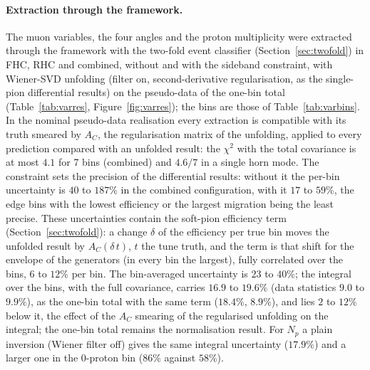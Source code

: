 \documentclass[11pt,a4paper]{article}
\begin{document}
\paragraph{Extraction through the framework.} The muon variables, the four angles and the proton multiplicity were
extracted through the framework with the two-fold event classifier (Section~\ref{sec:twofold}) in FHC, RHC and combined,
without and with the sideband constraint, with Wiener-SVD unfolding (filter on, second-derivative regularisation, as the
single-pion differential results) on the pseudo-data of the one-bin total (Table~\ref{tab:varres},
Figure~\ref{fig:varres}); the bins are those of Table~\ref{tab:varbins}. In the nominal pseudo-data realisation every
extraction is compatible with its truth smeared by $A_C$, the regularisation matrix of the unfolding, applied to every
prediction compared with an unfolded result: the $\chi^2$ with the total covariance is at most $4.1$ for 7 bins
(combined) and $4.6/7$ in a single horn mode. The constraint sets the precision of the differential results: without it the per-bin uncertainty is
$40$ to $187\%$ in the combined configuration, with it $17$ to $59\%$, the edge bins with the lowest efficiency or the
largest migration being the least precise. These uncertainties contain the soft-pion efficiency term
(Section~\ref{sec:twofold}): a change $\delta$ of the efficiency per true bin moves the unfolded result by
$A_C(\delta\, t)$, $t$ the tune truth, and the term is that shift for the envelope of the generators (in every bin
the largest), fully correlated over the bins, $6$ to $12\%$ per bin. The bin-averaged uncertainty is $23$ to $40\%$;
the integral over the bins, with the full covariance, carries $16.9$ to $19.6\%$ (data statistics $9.0$ to $9.9\%$),
as the one-bin total with the same term ($18.4\%$, $8.9\%$), and lies $2$ to $12\%$ below it, the effect of the $A_C$
smearing of the regularised unfolding on the integral; the one-bin total remains the normalisation result. For $N_p$
a plain inversion (Wiener filter off) gives
the same integral uncertainty ($17.9\%$) and a larger one in the 0-proton bin ($86\%$ against $58\%$).
\end{document}
